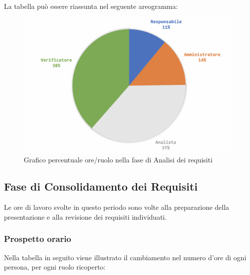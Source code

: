 			La tabella può essere riassunta nel seguente areogramma:
			\begin{figure}[H]
				\centering
				\includegraphics[width=0.8\linewidth]{./images/analisiCons2.png}
				\caption{Grafico percentuale ore/ruolo nella fase di Analisi dei requisiti}
				\label{fig:grafico costi ruolo fase Analisi}
			\end{figure}
		
		

		\subsection{Fase di Consolidamento dei Requisiti}
		Le ore di lavoro svolte in questo periodo sono volte alla preparazione della presentazione e alla revisione dei requisiti individuati. 
		\subsubsection{Prospetto orario}
			Nella tabella in seguito viene illustrato il cambiamento nel numero d'ore di ogni persona, per ogni ruolo ricoperto:
			
